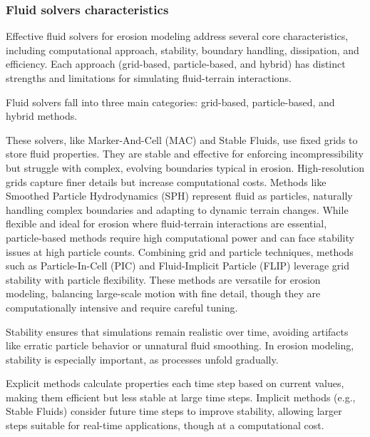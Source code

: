 \subsubsection{Fluid solvers characteristics}
Effective fluid solvers for erosion modeling address several core characteristics, including computational approach, stability, boundary handling, dissipation, and efficiency. Each approach (grid-based, particle-based, and hybrid) has distinct strengths and limitations for simulating fluid-terrain interactions.

Fluid solvers fall into three main categories: grid-based, particle-based, and hybrid methods.

\begin{Itemize}
     These solvers, like Marker-And-Cell (MAC) and Stable Fluids, use fixed grids to store fluid properties. They are stable and effective for enforcing incompressibility but struggle with complex, evolving boundaries typical in erosion. High-resolution grids capture finer details but increase computational costs.
     Methods like Smoothed Particle Hydrodynamics (SPH) represent fluid as particles, naturally handling complex boundaries and adapting to dynamic terrain changes. While flexible and ideal for erosion where fluid-terrain interactions are essential, particle-based methods require high computational power and can face stability issues at high particle counts.
     Combining grid and particle techniques, methods such as Particle-In-Cell (PIC) and Fluid-Implicit Particle (FLIP) leverage grid stability with particle flexibility. These methods are versatile for erosion modeling, balancing large-scale motion with fine detail, though they are computationally intensive and require careful tuning.
\end{Itemize}


Stability ensures that simulations remain realistic over time, avoiding artifacts like erratic particle behavior or unnatural fluid smoothing. In erosion modeling, stability is especially important, as processes unfold gradually.

Explicit methods calculate properties each time step based on current values, making them efficient but less stable at large time steps. Implicit methods (e.g., Stable Fluids) consider future time steps to improve stability, allowing larger steps suitable for real-time applications, though at a computational cost.

